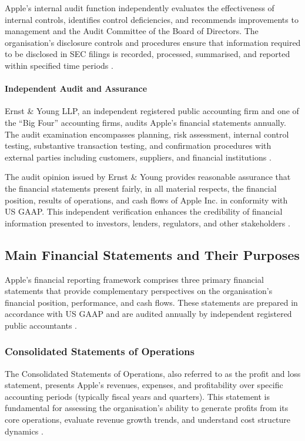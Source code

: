 \documentclass[12pt,a4paper]{article}
\begin{document}
Apple's internal audit function independently evaluates the effectiveness of internal controls, identifies control deficiencies, and recommends improvements to management and the Audit Committee of the Board of Directors. The organisation's disclosure controls and procedures ensure that information required to be disclosed in SEC filings is recorded, processed, summarised, and reported within specified time periods \citep{apple202410k}.

\paragraph{Independent Audit and Assurance}

Ernst \& Young LLP, an independent registered public accounting firm and one of the ``Big Four'' accounting firms, audits Apple's financial statements annually. The audit examination encompasses planning, risk assessment, internal control testing, substantive transaction testing, and confirmation procedures with external parties including customers, suppliers, and financial institutions \citep{apple202410k}.

The audit opinion issued by Ernst \& Young provides reasonable assurance that the financial statements present fairly, in all material respects, the financial position, results of operations, and cash flows of Apple Inc. in conformity with US GAAP. This independent verification enhances the credibility of financial information presented to investors, lenders, regulators, and other stakeholders \citep{kieso2023}.

\subsection{Main Financial Statements and Their Purposes}

Apple's financial reporting framework comprises three primary financial statements that provide complementary perspectives on the organisation's financial position, performance, and cash flows. These statements are prepared in accordance with US GAAP and are audited annually by independent registered public accountants \citep{fasb2024}.

\subsubsection{Consolidated Statements of Operations}

The Consolidated Statements of Operations, also referred to as the profit and loss statement, presents Apple's revenues, expenses, and profitability over specific accounting periods (typically fiscal years and quarters). This statement is fundamental for assessing the organisation's ability to generate profits from its core operations, evaluate revenue growth trends, and understand cost structure dynamics \citep{kieso2023}.
\end{document}
